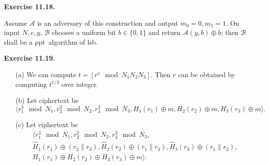 \documentclass[a4paper]{article}
\newenvironment{exercise}[1]{
	\par
	\noindent\textbf{Exercise #1.}\quad
}{
	\par
	\bigskip
}
\newcommand{\bin}{\{0,1\}}
\newcommand{\lsb}{\mathrm{lsb}}
\newcommand{\ppt}{{\sc ppt}~}
\newcommand{\Acal}{\mathcal{A}}
\newcommand{\Bcal}{\mathcal{B}}
\begin{document}
\begin{exercise}{11.18}
    Assume $\Acal$ is an adversary of this construction and output $m_0=0,m_1=1$.
    On input $N,e,y$, $\Bcal$ chooses a uniform bit $b\in\bin$ and return $\Acal(y,b)\oplus b$; 
    then $\Bcal$ shall be a \ppt algorithm of $\lsb$.
\end{exercise}

\begin{exercise}{11.19}
    \begin{itemize}
        \item[(a)]
            We can compute $t=[r^s\mod N_1N_2N_3]$. Then $r$ can be obtained by computing $t^{1/3}$ over integer.
        \item[(b)]
            Let ciphertext be 
            $$
            \langle 
            r_1^3\mod N_1,r_2^3\mod N_2,r_3^3\mod N_3,
            H_1(r_1)\oplus m,H_2(r_2)\oplus m,H_3(r_3)\oplus m
            \rangle.
            $$
        \item[(c)]
            Let ciphertext be 
            \begin{align*}
                &\langle 
            r_1^3\mod N_1,r_2^3\mod N_2,r_3^3\mod N_3,\\
                &\hat H_1(r_1)\oplus(r_2\|r_3),\hat H_2(r_2)\oplus(r_1\|r_3),\hat H_3(r_3)\oplus(r_1\|r_2),\\
                &H_1(r_1)\oplus H_2(r_2)\oplus H_3(r_3)\oplus m
            \rangle.
            \end{align*}
    \end{itemize}
\end{exercise}
\end{document}

